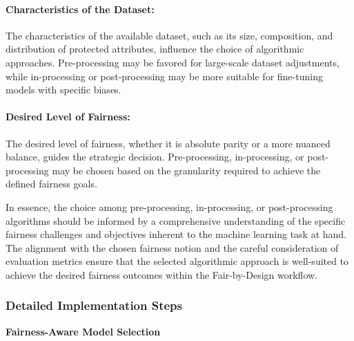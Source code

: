 \paragraph{Characteristics of the Dataset:}
The characteristics of the available dataset, such as its size, composition, and distribution of protected attributes, influence the choice of algorithmic approaches. Pre-processing may be favored for large-scale dataset adjustments, while in-processing or post-processing may be more suitable for fine-tuning models with specific biases.

\paragraph{Desired Level of Fairness:}
The desired level of fairness, whether it is absolute parity or a more nuanced balance, guides the strategic decision. Pre-processing, in-processing, or post-processing may be chosen based on the granularity required to achieve the defined fairness goals.

In essence, the choice among pre-processing, in-processing, or post-processing algorithms should be informed by a comprehensive understanding of the specific fairness challenges and objectives inherent to the machine learning task at hand. The alignment with the chosen fairness notion and the careful consideration of evaluation metrics ensure that the selected algorithmic approach is well-suited to achieve the desired fairness outcomes within the Fair-by-Design workflow.

\subsubsection{Detailed Implementation Steps}


\textbf{Fairness-Aware Model Selection}

